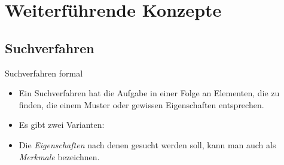 \section{Weiterführende Konzepte}

\subsection{Suchverfahren}

\begin{frame}{Suchverfahren formal}
    \begin{itemize}[<+(1)->]
        \item Ein Suchverfahren hat die Aufgabe in einer Folge an Elementen,\pause{} die zu finden, die einem Muster oder gewissen Eigenschaften entsprechen.
        \item Es gibt zwei Varianten: 
        \item Die \emph{Eigenschaften} nach denen gesucht werden soll, kann man auch als \emph{Merkmale} bezeichnen.
    \end{itemize}
\end{frame}

